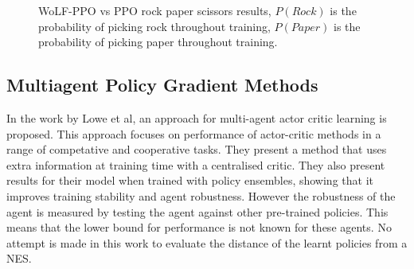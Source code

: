 \documentclass[conference]{IEEEtran}
\begin{document}
\begin{figure}[htbp]
    \caption{WoLF-PPO vs PPO rock paper scissors results, $P(Rock)$ is the probability of picking rock throughout training, $P(Paper)$ is the probability of picking paper throughout training.}
\end{figure}


\subsection{Multiagent Policy Gradient Methods}

In the work by Lowe et al\cite{lowe2017multi}, an approach for multi-agent actor critic learning is proposed. This approach focuses on performance of actor-critic methods in a range of competative and cooperative tasks. They present a method that uses extra information at training time with a centralised critic. They also present results for their model when trained with policy ensembles, showing that it improves training stability and agent robustness. However the robustness of the agent is measured by testing the agent against other pre-trained policies. This means that the lower bound for performance is not known for these agents. No attempt is made in this work to evaluate the distance of the learnt policies from a NES.
\end{document}
